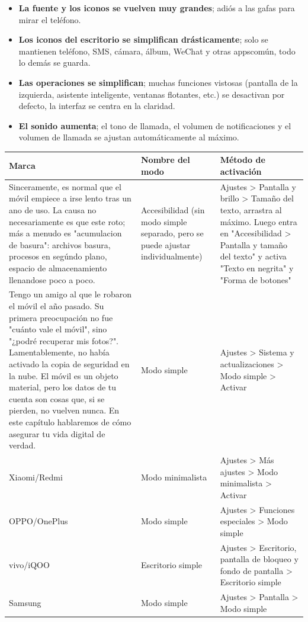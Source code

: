 \begin{itemize}
  \item \textbf{La fuente y los iconos se vuelven muy grandes}; adiós a las gafas para mirar el teléfono.
  \item \textbf{Los iconos del escritorio se simplifican drásticamente}; solo se mantienen teléfono, SMS, cámara, álbum, WeChat y otras appscomún, todo lo demás se guarda.
  \item \textbf{Las operaciones se simplifican}; muchas funciones vistosas (pantalla de la izquierda, asistente inteligente, ventanas flotantes, etc.) se desactivan por defecto, la interfaz se centra en la claridad.
  \item \textbf{El sonido aumenta}; el tono de llamada, el volumen de notificaciones y el volumen de llamada se ajustan automáticamente al máximo.
\end{itemize}


\begin{center}
\begin{tabularx}{\linewidth}{|X|X|X|}
\hline
\textbf{Marca} & \textbf{Nombre del modo} & \textbf{Método de activación} \tabularnewline
\hline
Sinceramente, es normal que el móvil empiece a irse lento tras un ano de uso. La causa no necesariamente es que este roto; más a menudo es "acumulacion de basura": archivos basura, procesos en segúndo plano, espacio de almacenamiento llenandose poco a poco. & Accesibilidad (sin modo simple separado, pero se puede ajustar individualmente) & Ajustes > Pantalla y brillo > Tamaño del texto, arrastra al máximo. Luego entra en "Accesibilidad > Pantalla y tamaño del texto" y activa "Texto en negrita" y "Forma de botones" \tabularnewline
Tengo un amigo al que le robaron el móvil el año pasado. Su primera preocupación no fue "cuánto vale el móvil", sino "¿podré recuperar mis fotos?". Lamentablemente, no había activado la copia de seguridad en la nube. El móvil es un objeto material, pero los datos de tu cuenta son cosas que, si se pierden, no vuelven nunca. En este capítulo hablaremos de cómo asegurar tu vida digital de verdad. & Modo simple & Ajustes > Sistema y actualizaciones > Modo simple > Activar \tabularnewline
Xiaomi/Redmi & Modo minimalista & Ajustes > Más ajustes > Modo minimalista > Activar \tabularnewline
OPPO/OnePlus & Modo simple & Ajustes > Funciones especiales > Modo simple \tabularnewline
vivo/iQOO & Escritorio simple & Ajustes > Escritorio, pantalla de bloqueo y fondo de pantalla > Escritorio simple \tabularnewline
Samsung & Modo simple & Ajustes > Pantalla > Modo simple \tabularnewline
\hline
\end{tabularx}
\end{center}

